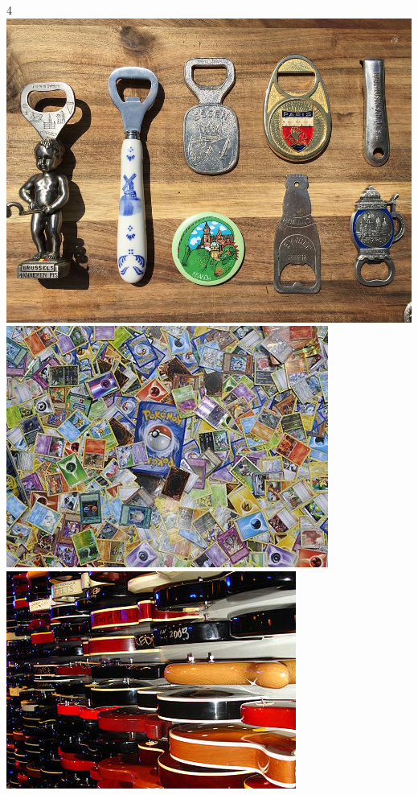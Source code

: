 \begin{frame}
\begin{textblock*}{4\TPHorizModule}
    \includegraphics*[height=1.5\TPVertModule,width=\TPHorizModule]{Collection_of_bottle_openers}
    \includegraphics*[height=1.5\TPVertModule,width=\TPHorizModule]{Pokemon_collection}
    \includegraphics*[height=1.5\TPVertModule,width=\TPHorizModule]{360px-Wall_of_guitars}
  \end{textblock*}

\end{frame}

